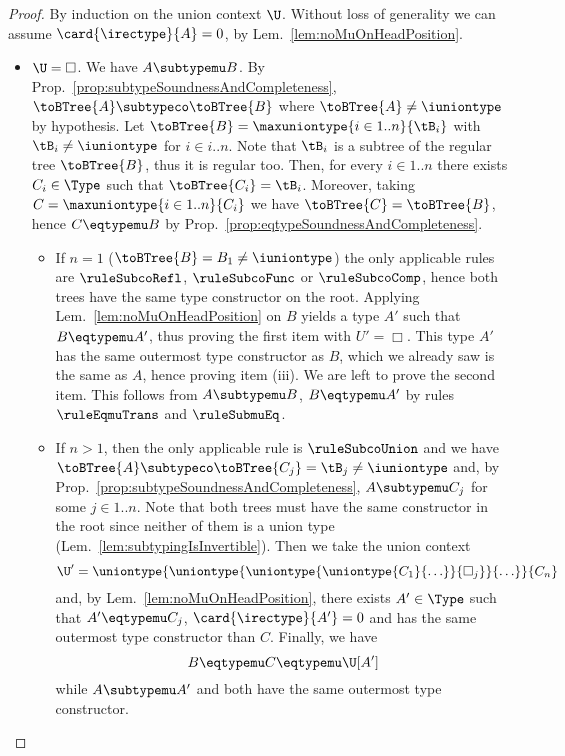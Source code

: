 \begin{proof}
By induction on the union context $\U$. Without loss of generality we can
assume $\card{\irectype}{A} = 0$, by Lem.~\ref{lem:noMuOnHeadPosition}.
\begin{itemize}
  \item $\U = \Box$. We have $A \subtypemu B$. By
  Prop.~\ref{prop:subtypeSoundnessAndCompleteness}, $\toBTree{A} \subtypeco
  \toBTree{B}$ where $\toBTree{A} \neq \iuniontype$ by hypothesis. Let
  $\toBTree{B} = \maxuniontype{i \in 1..n}{\tB_i}$ with $\tB_i \neq
  \iuniontype$ for $i \in i..n$. Note that $\tB_i$ is a subtree of the regular
  tree $\toBTree{B}$, thus it is regular too. Then, for every $i \in 1..n$
  there exists $C_i \in \Type$ such that $\toBTree{C_i} = \tB_i$. Moreover,
  taking $C = \maxuniontype{i \in 1..n}{C_i}$ we have $\toBTree{C} =
  \toBTree{B}$, hence $C \eqtypemu B$ by
  Prop.~\ref{prop:eqtypeSoundnessAndCompleteness}.
  \begin{itemize}
    \item If $n = 1$ (\ie $\toBTree{B} = B_1 \neq \iuniontype$) the only
    applicable rules are $\ruleSubcoRefl$, $\ruleSubcoFunc$ or
    $\ruleSubcoComp$, hence both trees have the same type constructor on the
    root. Applying Lem.~\ref{lem:noMuOnHeadPosition} on $B$ yields a type $A'$
    such that $B \eqtypemu A'$, thus proving the first item with $U' = \Box$.
    This type $A'$ has the same outermost type constructor as $B$, which we
    already saw is the same as $A$, hence proving item (iii). We are left to
    prove the second item. This follows from $A \subtypemu B$, $B \eqtypemu A'$
    by rules $\ruleEqmuTrans$ and $\ruleSubmuEq$.
    
    \item If $n > 1$, then the only applicable rule is $\ruleSubcoUnion$ and we
    have $\toBTree{A} \subtypeco \toBTree{C_j} = \tB_j \neq \iuniontype$ and,
    by Prop.~\ref{prop:subtypeSoundnessAndCompleteness}, $A \subtypemu C_j$ for
    some $j \in 1..n$. Note that both trees must have the same constructor in
    the root since neither of them is a union type
    (Lem.~\ref{lem:subtypingIsInvertible}).
    Then we take the union context $$\U' =
    \uniontype{\uniontype{\uniontype{\uniontype{C_1}{\ldots}}{\Box_j}}{\ldots}}{C_n}$$
    and, by Lem.~\ref{lem:noMuOnHeadPosition}, there exists $A' \in \Type$ such
    that $A' \eqtypemu C_j$, $\card{\irectype}{A'} = 0$ and has the same
    outermost type constructor than $C$. Finally, we have $$B \eqtypemu C
    \eqtypemu \U[A']$$ while $A \subtypemu A'$ and both have the same outermost
    type constructor.
  \end{itemize}


\end{itemize}
\end{proof}

